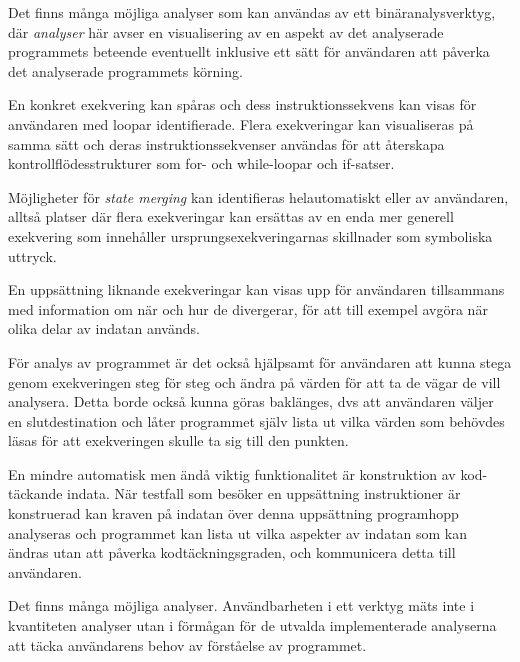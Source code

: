 Det finns många möjliga analyser som kan användas av ett binäranalysverktyg, där
\textit{analyser} här avser en visualisering av en aspekt av det analyserade
programmets beteende eventuellt inklusive ett sätt för användaren att påverka
det analyserade programmets körning.

En konkret exekvering kan spåras och dess instruktionssekvens kan visas för
användaren med loopar identifierade. Flera exekveringar kan visualiseras på
samma sätt och deras instruktionssekvenser användas för att återskapa
kontrollflödesstrukturer som for- och while-loopar och if-satser.

Möjligheter för \textit{state merging} kan identifieras helautomatiskt eller av
användaren, alltså platser där flera exekveringar kan ersättas av en enda mer
generell exekvering som innehåller ursprungsexekveringarnas skillnader som
symboliska uttryck.

En uppsättning liknande exekveringar kan visas upp för användaren tillsammans
med information om när och hur de divergerar, för att till exempel avgöra när
olika delar av indatan används.

För analys av programmet är det också hjälpsamt för användaren att kunna stega
genom exekveringen steg för steg och ändra på värden för att ta de vägar de vill
analysera. Detta borde också kunna göras baklänges, dvs att användaren väljer en
slutdestination och låter programmet själv lista ut vilka värden som behövdes
läsas för att exekveringen skulle ta sig till den punkten.

En mindre automatisk men ändå viktig funktionalitet är konstruktion av
kod-täckande indata. När testfall som besöker en uppsättning instruktioner är
konstruerad kan kraven på indatan över denna uppsättning programhopp analyseras
och programmet kan lista ut vilka aspekter av indatan som kan ändras utan att
påverka kodtäckningsgraden, och kommunicera detta till användaren.

Det finns många möjliga analyser. Användbarheten i ett verktyg mäts inte i
kvantiteten analyser utan i förmågan för de utvalda implementerade analyserna
att täcka användarens behov av förståelse av programmet.
